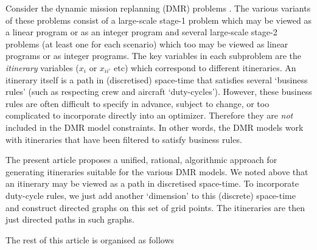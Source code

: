 Consider the dynamic mission replanning (DMR) problems \cite{dmr-planning,dmr-execution}. The various variants of these problems consist of a large-scale stage-1 problem which may be viewed as a linear program or as an integer program and several large-scale stage-2 problems (at least one for each scenario) which too may be viewed as linear programs or as integer programs. The key variables in each subproblem are the \textit{itinerary} variables ($x_i$ or $x_{ii'}$ etc) which correspond to different itineraries. An itinerary itself is a path in (discretised) space-time that satisfies several `business rules' (such as respecting crew and aircraft `duty-cycles'). However, these business rules are often difficult to specify in advance, subject to change, or too complicated to incorporate directly into an optimizer. Therefore they are \textit{not} included in the DMR model constraints. In other words, the DMR models work with itineraries that have been filtered to satisfy business rules.

The present article proposes a unified, rational, algorithmic approach for generating itineraries suitable for the various DMR models. We noted above that an itinerary may be viewed as a path in discretised space-time. To incorporate duty-cycle rules, we just add another `dimension' to this (discrete) space-time and construct directed graphs on this set of grid points. The itineraries are then just directed paths in such graphs.

The rest of this article is organised as follows